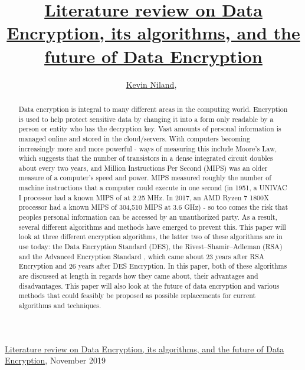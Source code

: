 \documentclass[journal]{IEEEtran}
\begin{document}
{\href{https://github.com/kevinniland97/Literature-review-on-Data-Encryption-algorithm}{Literature review on Data Encryption, its algorithms, and the future of Data Encryption}, November 2019}

\title{\href{https://github.com/kevinniland97/Literature-review-on-Data-Encryption-algorithms}{Literature review on Data Encryption, its algorithms, and the future of Data Encryption}}
\author{\href{https://github.com/kevinniland97}{Kevin Niland},~}
\maketitle

\begin{abstract}
Data encryption is integral to many different areas in the computing world. Encryption is used to help protect sensitive data by changing it into a form only readable by a person or entity who has the decryption key. Vast amounts of personal information is managed online and stored in the cloud/servers. With computers becoming increasingly more and more powerful - ways of measuring this include Moore's Law, which suggests that the number of transistors in a dense integrated circuit doubles about every two years, and Million Instructions Per Second (MIPS) was an older measure of a computer's speed and power. MIPS measured roughly the number of machine instructions that a computer could execute in one second (in 1951, a UNIVAC I processor had a known MIPS of at 2.25 MHz. In 2017, an AMD Ryzen 7 1800X processor had a known MIPS of 304,510 MIPS at 3.6 GHz) - so too comes the risk that peoples personal information can be accessed by an unauthorized party. As a result, several different algorithms and methods have emerged to prevent this. This paper will look at three different encryption algorithms, the latter two of these algorithms are in use today: the Data Encryption Standard (DES), the Rivest–Shamir–Adleman (RSA) \cite{RSA} and the Advanced Encryption Standard \cite{AES}, which came about 23 years after RSA Encryption and 26 years after DES Encryption. In this paper, both of these algorithms are discussed at length in regards how they came about, their advantages and disadvantages. This paper will also look at the future of data encryption and various methods that could feasibly be proposed as possible replacements for current algorithms and techniques. 
\end{abstract}
\end{document}
